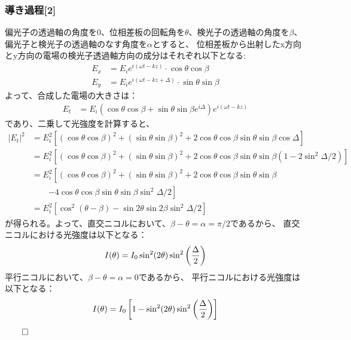 \documentclass{article}
\begin{document}
\subsubsection*{導き過程[2]}
\begin{spacing}{1.2}
    偏光子の透過軸の角度を$0$、位相差板の回転角を$\theta$、検光子の透過軸の角度を$\beta$、偏光子と検光子の透過軸のなす角度を$\alpha$とすると、
    位相差板から出射したx方向とy方向の電場の検光子透過軸方向の成分はそれぞれ以下となる: 
    \begin{align*}
        E_x &= E_i e^{i(\omega t - kz)} \cdot \cos{\theta} \cos{\beta}\\
        E_y &= E_i e^{i(\omega t - kz + \Delta)} \cdot \sin{\theta} \sin{\beta}
    \end{align*}
    よって、合成した電場の大きさは：
    \begin{align*}
        E_t &= E_i \left(\cos{\theta}\cos{\beta} + \sin{\theta}\sin{\beta}e^{i\Delta}\right)e^{i(\omega t - kz)}
    \end{align*}
    であり、二乗して光強度を計算すると、
    \begin{align*}
        |E_t|^2 &= E_i^2 \left[(\cos{\theta}\cos{\beta})^2 + (\sin{\theta}\sin{\beta})^2 + 2\cos{\theta}\cos{\beta}\sin{\theta}\sin{\beta}\cos{\Delta}\right] \\
                &= E_i^2 \left[(\cos{\theta}\cos{\beta})^2 + (\sin{\theta}\sin{\beta})^2 + 2\cos{\theta}\cos{\beta}\sin{\theta}\sin{\beta}(1 - 2 \sin^2{\Delta / 2})\right] \\
                &= E_i^2 \left[(\cos{\theta}\cos{\beta})^2 + (\sin{\theta}\sin{\beta})^2 + 2\cos{\theta}\cos{\beta}\sin{\theta}\sin{\beta} \right. \\
                &\qquad \left. - 4 \cos{\theta}\cos{\beta}\sin{\theta}\sin{\beta}\sin^2{\Delta/2}\right] \\ %
                &= E_i^2 \left[\cos^2{(\theta - \beta)} - \sin{2 \theta}\sin{2 \beta}\sin^2{\Delta/2}\right]
    \end{align*}
    が得られる。よって、直交ニコルにおいて、$\beta - \theta = \alpha = \pi/2$であるから、
    直交ニコルにおける光強度は以下となる：
    \begin{equation}
        I(\theta) = I_0 \sin^2(2\theta) \sin^2\left(\frac{\Delta}{2}\right) \notag
    \end{equation}
    平行ニコルにおいて、$\beta - \theta = \alpha = 0$であるから、
    平行ニコルにおける光強度は以下となる：
    \begin{equation}
        I(\theta) = I_0 \left[ 1 - \sin^2(2\theta) \sin^2\left(\frac{\Delta}{2}\right) \right] \notag
    \end{equation}
    \begin{flushright} %
        $\qed$
    \end{flushright}
\end{spacing}
\end{document}
